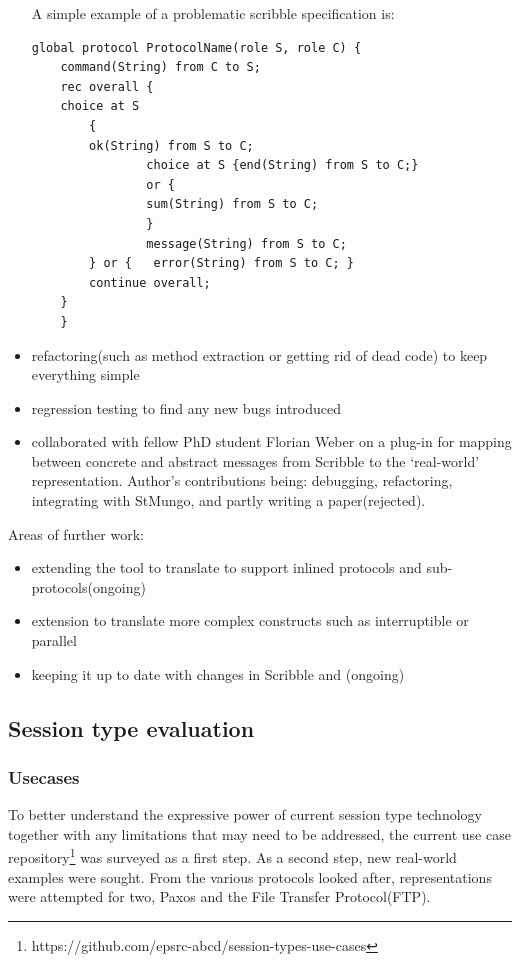 \begin{itemize}
  A simple example of a problematic scribble specification is:
  \begin{lstlisting}[basicstyle=\footnotesize]
  global protocol ProtocolName(role S, role C) {
    command(String) from C to S;
    rec overall {
    choice at S
    	{
    	ok(String) from S to C;
    			choice at S {end(String) from S to C;}
    			or {
    			sum(String) from S to C;
    			}
    			message(String) from S to C;
    	} or {	 error(String) from S to C;	}
    	continue overall;
    }
    }
  \end{lstlisting}
  \item refactoring(such as method extraction or getting rid of dead code) to keep everything simple
  \item regression testing to find any new bugs introduced
  \item collaborated with fellow PhD student Florian Weber on a plug-in for mapping between concrete and abstract messages from Scribble to the `real-world' representation. Author's contributions being: debugging, refactoring, integrating with StMungo, and partly writing a paper(rejected).
\end{itemize}

Areas of further work:
\begin{itemize}
  \item extending the tool to translate to support inlined protocols and sub-protocols(ongoing)
  \item extension to translate more complex constructs such as interruptible or parallel
  \item keeping it up to date with changes in Scribble and \Mungo(ongoing)
\end{itemize}

\subsection{Session type evaluation}

\subsubsection{Usecases}
\label{sub:usecases}

To better understand the expressive power of current session type technology together with any limitations that may need to be addressed, the current use case repository\footnote{https://github.com/epsrc-abcd/session-types-use-cases} was surveyed as a first step. As a second step, new real-world examples were sought. From the various protocols looked after, representations were attempted for two, Paxos and the File Transfer Protocol(FTP).


